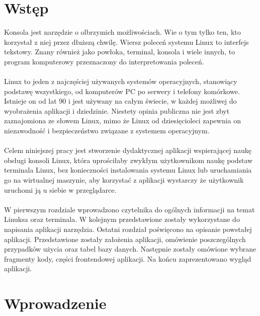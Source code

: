\documentclass[10pt,a4paper]{report}
\begin{document}
\normalsize 

\begin{adjustwidth}{2cm}{2cm}
\tableofcontents
\chapter*{Wstęp}
\begin{minipage}{1\linewidth}
Konsola jest narzędzie o olbrzymich możliwościach. Wie o tym tylko ten, kto korzystał z niej przez dłuższą chwilę. Wiersz poleceń systemu Linux to interfejs tekstowy. Znany również jako powłoka, terminal, konsola i wiele innych, to program komputerowy przeznaczony do interpretowania poleceń. \\ \\
Linux to jeden z najczęściej używanych systemów operacyjnych, stanowiący podstawę wszystkiego, od komputerów PC po serwery i telefony komórkowe. Istnieje on od lat 90 i jest używany na całym świecie, w każdej możliwej do wyobrażenia aplikacji i dziedzinie. Niestety opinia publiczna nie jest zbyt zaznajomiona ze słowem Linux, mimo że Linux od dziesięcioleci zapewnia on niezawodność i bezpieczeństwo związane z systemem operacyjnym. \\ \\
Celem niniejszej pracy jest stworzenie dydaktycznej aplikacji wspierającej naukę obsługi konsoli Linux, która uprościłaby zwykłym użytkownikom naukę podstaw terminala Linux, bez konieczności instalowania systemu Linux lub uruchamiania go na wirtualnej maszynie, aby korzystać z aplikacji wystarczy że użytkownik uruchomi ją u siebie w przeglądarce. \\ \\
W pierwszym rozdziale wprowadzono czytelnika do ogólnych informacji na temat Linuksa oraz terminala. W kolejnym przedstawione zostały wykorzystane do napisania aplikacji narzędzia.
Ostatni rozdział poświęcono na opisanie powstałej aplikacji. Przedstawione zostały założenia aplikacji, omówienie poszczególnych przypadków użycia oraz tabel bazy danych. Następnie zostały omówione wybrane fragmenty kody, części frontendowej aplikacji. Na końcu zaprezentowano wygląd aplikacji.
\end{minipage}
\chapter{Wprowadzenie}

\end{adjustwidth}
\end{document}
